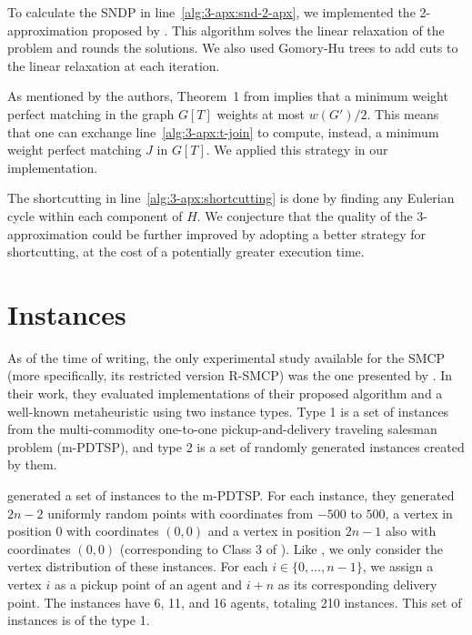 
To calculate the SNDP in line~\eqref{alg:3-apx:snd-2-apx}, we implemented the 2-approximation proposed by \cite{snd-2-apx}. This algorithm solves the linear relaxation of the problem and rounds the solutions. We also used Gomory-Hu trees to add cuts to the linear relaxation at each iteration.

As mentioned by the authors, Theorem~1 from \cite{smcp_3apx} implies that a minimum weight perfect matching in the graph \(G[T]\) weights at most \(w(G')/2\). This means that one can exchange line~\eqref{alg:3-apx:t-join} to compute, instead, a minimum weight perfect matching \(J\) in \(G[T]\). We applied this strategy in our implementation.

The shortcutting in line~\eqref{alg:3-apx:shortcutting} is done by finding any Eulerian cycle within each component of \(H\). We conjecture that the quality of the 3-approximation could be further improved by adopting a better strategy for shortcutting, at the cost of a potentially greater execution time.

\section{Instances}

As of the time of writing, the only experimental study available for the SMCP (more specifically, its restricted version R-SMCP) was the one presented by \cite{Pereira2018TheSM}. In their work, they evaluated implementations of their proposed algorithm and a well-known metaheuristic using two instance types. Type 1 is a set of instances from the multi-commodity one-to-one pickup-and-delivery traveling salesman problem (m-PDTSP), and type 2 is a set of randomly generated instances created by them.

\cite{HERNANDEZPEREZ2009987} generated a set of instances to the m-PDTSP. For each instance, they generated \(2n - 2\) uniformly random points with coordinates from \(-500\) to \(500\), a vertex in position \(0\) with coordinates \((0, 0)\) and a vertex in position \(2n - 1\) also with coordinates \((0, 0)\) (corresponding to Class 3 of \cite{HERNANDEZPEREZ2009987}). Like \cite{Pereira2018TheSM}, we only consider the vertex distribution of these instances. For each \(i \in \{0, \dots, n - 1\}\), we assign a vertex \(i\) as a pickup point of an agent and \(i + n\) as its corresponding delivery point. The instances have 6, 11, and 16 agents, totaling 210 instances. This set of instances is of the type 1.

